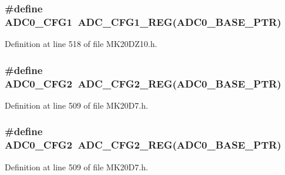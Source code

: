 \subsubsection[{\texorpdfstring{A\+D\+C0\+\_\+\+C\+F\+G1}{ADC0_CFG1}}]{\setlength{\rightskip}{0pt plus 5cm}\#define A\+D\+C0\+\_\+\+C\+F\+G1~{\bf A\+D\+C\+\_\+\+C\+F\+G1\+\_\+\+R\+EG}({\bf A\+D\+C0\+\_\+\+B\+A\+S\+E\+\_\+\+P\+TR})}\hypertarget{group___a_d_c___register___accessor___macros_ga74e7b7426570c776cdb8a83a9a20c654}{}\label{group___a_d_c___register___accessor___macros_ga74e7b7426570c776cdb8a83a9a20c654}


Definition at line 518 of file M\+K20\+D\+Z10.\+h.

\subsubsection[{\texorpdfstring{A\+D\+C0\+\_\+\+C\+F\+G2}{ADC0_CFG2}}]{\setlength{\rightskip}{0pt plus 5cm}\#define A\+D\+C0\+\_\+\+C\+F\+G2~{\bf A\+D\+C\+\_\+\+C\+F\+G2\+\_\+\+R\+EG}({\bf A\+D\+C0\+\_\+\+B\+A\+S\+E\+\_\+\+P\+TR})}\hypertarget{group___a_d_c___register___accessor___macros_gaf8d364b043484d65f099b0cdbe4a680c}{}\label{group___a_d_c___register___accessor___macros_gaf8d364b043484d65f099b0cdbe4a680c}


Definition at line 509 of file M\+K20\+D7.\+h.

\subsubsection[{\texorpdfstring{A\+D\+C0\+\_\+\+C\+F\+G2}{ADC0_CFG2}}]{\setlength{\rightskip}{0pt plus 5cm}\#define A\+D\+C0\+\_\+\+C\+F\+G2~{\bf A\+D\+C\+\_\+\+C\+F\+G2\+\_\+\+R\+EG}({\bf A\+D\+C0\+\_\+\+B\+A\+S\+E\+\_\+\+P\+TR})}\hypertarget{group___a_d_c___register___accessor___macros_gaf8d364b043484d65f099b0cdbe4a680c}{}\label{group___a_d_c___register___accessor___macros_gaf8d364b043484d65f099b0cdbe4a680c}


Definition at line 509 of file M\+K20\+D7.\+h.

